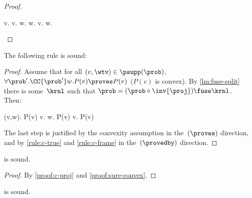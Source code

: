 \documentclass[acmsmall,nonacm,screen,appendix]{acmart}
\begin{document}
\begin{proof}
  \begin{eqexplain}
    \CMod{\prob} v. 
    \whichproves*
    \CMod{\mu} v.   w. 
    \whichproves
     w. \CMod{\mu} v.  
    \whichproves
     w.  
    \whichproves
  \end{eqexplain}
\end{proof}
 \begin{lemma}
\label{proof:c-proj}
  The following rule is sound:
  \begin{proofrule}
  \end{proofrule}
\end{lemma}
\begin{proof}
  Assume that for all $(v,\wtv)\in\psupp(\prob)$,
  $\forall \prob'. \CC{\prob'} w. P(v) \proves P(v)$
  (\ie $P(v)$ is convex).
  By \cref{lm:fuse-split} there is some~$\krnl$ such that
  $ \prob=(\prob\circ\inv{\proj})\fuse\krnl $.
  Then:
  \begin{eqexplain}
    \CC \prob (v,w). P(v)
    \whichisequiv*
    \CC {\prob\circ\inv{\proj}} v.
     w. P(v)
    \whichisequiv
    \CC {\prob\circ\inv{\proj}} v. P(v)
  \end{eqexplain}
  The last step is justified by the convexity assumption in the~$(\proves)$
  direction,
  and by \ref{rule:c-true} and \ref{rule:c-frame} in the~$(\provedby)$ direction.
\end{proof}



\begin{lemma}
\label{proof:c-sure-proj}
   is sound.
\end{lemma}
\begin{proof}
  By \cref{proof:c-proj} and \cref{proof:sure-convex}.
\end{proof}
 \begin{lemma}
\label{proof:c-sure-proj-many}
   is sound.
\end{lemma}
\end{document}

